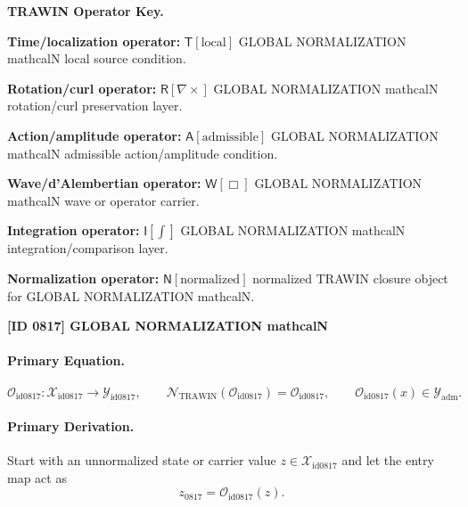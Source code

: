 \par\vspace{0.45\baselineskip}
\noindent\begin{minipage}[t]{\linewidth}
\begingroup
\small
\raggedright
\textbf{TRAWIN Operator Key.}\par
\noindent\textbf{Time/localization operator:} $\mathsf{T}\!\left[\mathrm{local}\right]$ GLOBAL NORMALIZATION mathcalN local source condition.\par
\noindent\textbf{Rotation/curl operator:} $\mathsf{R}\!\left[\nabla\times\right]$ GLOBAL NORMALIZATION mathcalN rotation/curl preservation layer.\par
\noindent\textbf{Action/amplitude operator:} $\mathsf{A}\!\left[\mathrm{admissible}\right]$ GLOBAL NORMALIZATION mathcalN admissible action/amplitude condition.\par
\noindent\textbf{Wave/d'Alembertian operator:} $\mathsf{W}\!\left[\Box\right]$ GLOBAL NORMALIZATION mathcalN wave or operator carrier.\par
\noindent\textbf{Integration operator:} $\mathsf{I}\!\left[\int\right]$ GLOBAL NORMALIZATION mathcalN integration/comparison layer.\par
\noindent\textbf{Normalization operator:} $\mathsf{N}\!\left[\mathrm{normalized}\right]$ normalized TRAWIN closure object for GLOBAL NORMALIZATION mathcalN.\par
\endgroup
\end{minipage}

\clearpage
\noindent\textbf{[ID 0817] GLOBAL NORMALIZATION mathcalN}\par
\vspace{0.35em}
\paragraph{Primary Equation.}
\[
\mathcal{O}_{\mathrm{id0817}}:\mathcal{X}_{\mathrm{id0817}}\longrightarrow \mathcal{Y}_{\mathrm{id0817}},\qquad
\mathcal{N}_{\mathrm{TRAWIN}}(\mathcal{O}_{\mathrm{id0817}})=\mathcal{O}_{\mathrm{id0817}},\qquad
\mathcal{O}_{\mathrm{id0817}}(x)\in\mathcal{Y}_{\mathrm{adm}}.
\]

\paragraph{Primary Derivation.} Start with an unnormalized state or carrier value $z\in \mathcal{X}_{\mathrm{id0817}}$ and let the entry map act as\[
z_{0817}=\mathcal{O}_{\mathrm{id0817}}(z).
\]

